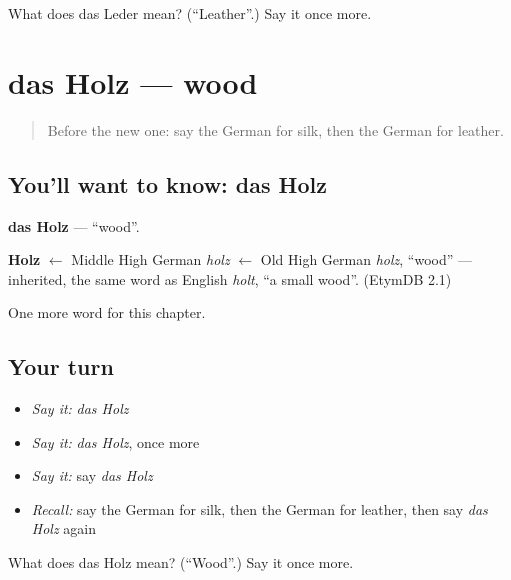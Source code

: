 \begin{tcolorbox}[breakable,colback=teal!4,colframe=teal!35!black,title={Before you move on}]
What does das Leder mean? (\textquotedblleft{}Leather\textquotedblright{}.) Say it once more.
\end{tcolorbox}
\section[das Holz]{das Holz — wood}

\label{lesson:GE-C204-holz}



\begin{quote}
Before the new one: say the German for silk, then the German for leather.
\end{quote}

\subsection*{You'll want to know: das Holz}
\textbf{das Holz} — \textquotedblleft{}wood\textquotedblright{}.

\begin{cousinweb}
\textbf{Holz} $\leftarrow$ Middle High German \emph{holz} $\leftarrow$ Old High German \emph{holz}, \textquotedblleft{}wood\textquotedblright{} — inherited, the same word as English \emph{holt}, \textquotedblleft{}a small wood\textquotedblright{}. (EtymDB 2.1)
\end{cousinweb}

\begin{grammarlens}[title={What you've built}]
One more word for this chapter.
\end{grammarlens}

\subsection*{Your turn}
\begin{itemize}
\raggedright
  \item \emph{Say it:} \emph{das Holz}
  \item \emph{Say it:} \emph{das Holz}, once more
  \item \emph{Say it:} say \emph{das Holz}
  \item \emph{Recall:} say the German for silk, then the German for leather, then say \emph{das Holz} again
\end{itemize}

\begin{tcolorbox}[breakable,colback=teal!4,colframe=teal!35!black,title={Before you move on}]
What does das Holz mean? (\textquotedblleft{}Wood\textquotedblright{}.) Say it once more.
\end{tcolorbox}
